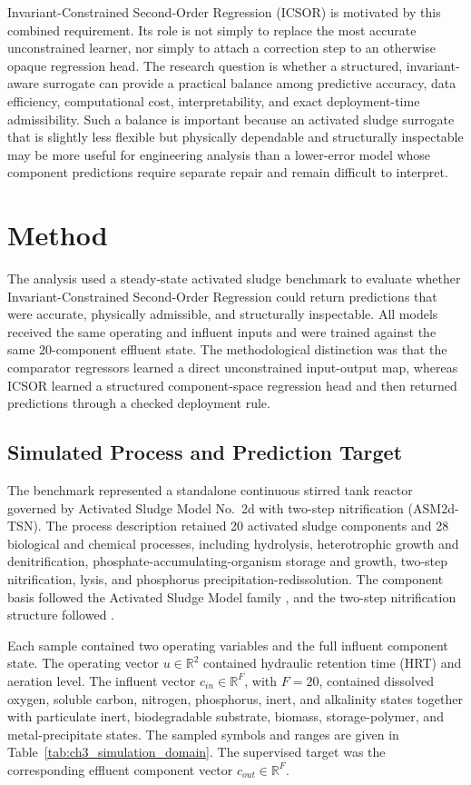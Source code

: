 \documentclass[12pt, twoside]{book}
\begin{document}
Invariant-Constrained Second-Order Regression (ICSOR) is motivated by this combined requirement. Its role is
not simply to replace the most accurate unconstrained learner, nor simply to attach a correction step to an
otherwise opaque regression head. The research question is whether a structured, invariant-aware surrogate can
provide a practical balance among predictive accuracy, data efficiency, computational cost, interpretability,
and exact deployment-time admissibility. Such a balance is important because an activated sludge surrogate that
is slightly less flexible but physically dependable and structurally inspectable may be more useful for
engineering analysis than a lower-error model whose component predictions require separate repair and remain
difficult to interpret.

\section{Method}

The analysis used a steady-state activated sludge benchmark to evaluate whether Invariant-Constrained
Second-Order Regression could return predictions that were accurate, physically admissible, and structurally
inspectable. All models received the same operating and influent inputs and were trained against the same
20-component effluent state. The methodological distinction was that the comparator regressors learned a
direct unconstrained input-output map, whereas ICSOR learned a structured component-space regression head and
then returned predictions through a checked deployment rule.

\subsection{Simulated Process and Prediction Target}

The benchmark represented a standalone continuous stirred tank reactor governed by Activated Sludge Model
No.\ 2d with two-step nitrification (ASM2d-TSN). The process description retained 20 activated sludge
components and 28 biological and chemical processes, including hydrolysis, heterotrophic growth and
denitrification, phosphate-accumulating-organism storage and growth, two-step nitrification, lysis, and
phosphorus precipitation-redissolution. The component basis followed the Activated Sludge Model family
\citep{Henze2006}, and the two-step nitrification structure followed \citet{Guerrero2011}.

Each sample contained two operating variables and the full influent component state. The operating vector
\(u\in\mathbb{R}^{2}\) contained hydraulic retention time (HRT) and aeration level. The influent vector
\(c_{in}\in\mathbb{R}^{F}\), with \(F=20\), contained dissolved oxygen, soluble carbon, nitrogen,
phosphorus, inert, and alkalinity states together with particulate inert, biodegradable substrate, biomass,
storage-polymer, and metal-precipitate states. The sampled symbols and ranges are given in
Table~\ref{tab:ch3_simulation_domain}. The supervised target was the corresponding effluent component vector
\(c_{out}\in\mathbb{R}^{F}\).
\end{document}
